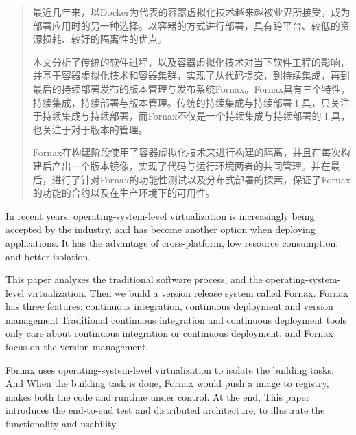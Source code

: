 
\begin{abstract}

最近几年来，以Docker为代表的容器虚拟化技术越来越被业界所接受，成为部署应用时的另一种选择。以容器的方式进行部署，具有跨平台、较低的资源损耗、较好的隔离性的优点。

本文分析了传统的软件过程，以及容器虚拟化技术对当下软件工程的影响，并基于容器虚拟化技术和容器集群，实现了从代码提交，到持续集成，再到最后的持续部署发布的版本管理与发布系统Fornax。Fornax具有三个特性，持续集成，持续部署与版本管理。传统的持续集成与持续部署工具，只关注于持续集成与持续部署，而Fornax不仅是一个持续集成与持续部署的工具，也关注于对于版本的管理。

Fornax在构建阶段使用了容器虚拟化技术来进行构建的隔离，并且在每次构建后产出一个版本镜像，实现了代码与运行环境两者的共同管理。并在最后，进行了针对Fornax的功能性测试以及分布式部署的探索，保证了Fornax的功能的合约以及在生产环境下的可用性。

\end{abstract}

\begin{englishabstract}

In recent years, operating-system-level virtualization is increasingly being accepted by the industry, and has become another option when deploying applications. It has the advantage of cross-platform, low resource consumption, and better isolation.

This paper analyzes the traditional software process, and the operating-system-level virtualization. Then we build a version release system called Fornax. Fornax has three features: continuous integration, continuous deployment and version management.Traditional continuous integration and continuous deployment tools only care about continuous integration or continuous deployment, and Fornax focus on the version management.

Fornax uses operating-system-level virtualization to isolate the building tasks. And When the building task is done, Fornax would push a image to registry, makes both the code and runtime under control. At the end, This paper introduces the end-to-end test and distributed architecture, to illustrate the functionality and usability.

\end{englishabstract}

